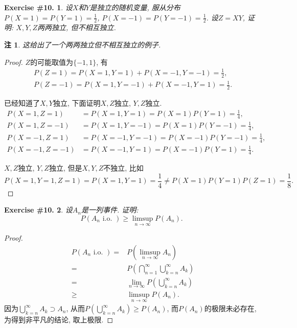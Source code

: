\documentclass[UTF8, a4paper]{article}
\newtheorem{exercise}{Exercise \#10.}
\newtheorem*{remark}{注}
\begin{document}
\begin{framed}
\begin{exercise}
设\(X\)和\(Y\)是独立的随机变量, 服从分布\(P(X = 1 ) = P(Y=1) = \frac{1}{2}\), \(P(X = -1) = P(Y = -1) = \frac{1}{2}\).
设\(Z = XY\), 证明: \(X,Y,Z\)两两独立, 但不相互独立.
\end{exercise}
\end{framed}
\begin{remark}
这给出了一个两两独立但不相互独立的例子.
\end{remark}
\begin{proof}
\(Z\)的可能取值为\(\{-1, 1\}\), 有
$$
\begin{gathered}
    P(Z = 1) = P(X = 1, Y = 1) + P(X = -1, Y = -1) = \frac{1}{2}, \\
    P(Z = -1) = P(X = 1, Y = -1) + P(X = -1, Y = 1) = \frac{1}{2}.
\end{gathered}
$$

已经知道了\(X, Y\)独立, 下面证明\(X, Z\)独立, \(Y,Z\)独立.
$$
\begin{aligned}
    P(X = 1, Z = 1) &= P(X = 1, Y = 1) = P(X = 1)P(Y = 1) = \frac{1}{4}, \\
    P(X = 1, Z = -1) &= P(X = 1, Y = -1) = P(X = 1)P(Y = -1) = \frac{1}{4}, \\
    P(X = -1, Z = 1) &= P(X = -1, Y = -1) = P(X = -1)P(Y = -1) = \frac{1}{4}, \\
    P(X = -1, Z = -1) &= P(X = -1, Y = 1) = P(X = -1)P(Y = 1) = \frac{1}{4}.
\end{aligned}
$$

\(X, Z\)独立, \(Y, Z\)独立, 但是\(X, Y, Z\)不独立, 比如
$$
P(X = 1, Y = 1, Z = 1) = P(X = 1, Y = 1) = \frac{1}{4} \neq P(X = 1)P(Y = 1)P(Z = 1) = \frac{1}{8}.
$$

\end{proof}



\begin{framed}
\begin{exercise}
设\(A_n\)是一列事件. 证明: $$
P\left(A_n \text { i.o. }\right) \geq \underset{n \rightarrow \infty}{\limsup } P\left(A_n\right) \text {. }
$$
\end{exercise}
\end{framed}

\begin{proof}
$$
\begin{aligned}
P(A_n \text{ i.o. }) =& P(\limsup_{n\to\infty} A_n) \\
=& P(\bigcap_{n=1}^{\infty} \bigcup_{k=n}^{\infty} A_k) \\
=& \lim_{n\to \infty} P(\bigcup_{k=n}^{\infty} A_k) \\
\geq & \limsup_{n\to \infty} P(A_n).
\end{aligned}
$$
因为\(\bigcup_{k=n}^{\infty} A_k \supset A_n\), 从而\(P(\bigcup_{k=n}^{\infty} A_k) \geq P(A_n)\), 而\(P(A_n)\)的极限未必存在, 为得到非平凡的结论, 取上极限.
\end{proof}
\end{document}
